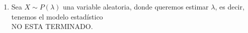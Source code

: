 \begin{ejemplo}
\begin{enumerate}
\begin{figure}[H]
            \caption{Entropía e Información de Fisher ($X\sim Ber(p)$).}
            \label{fig:entropia_fisher_bernoulli}
        \end{figure}
        \item Sea $X\sim P(\lambda)$ una variable aleatoria, donde queremos estimar $\lambda$, es decir, tenemos el modelo estadístico \\
        \noindent
        NO ESTA TERMINADO.
    \end{enumerate}
\end{ejemplo}

